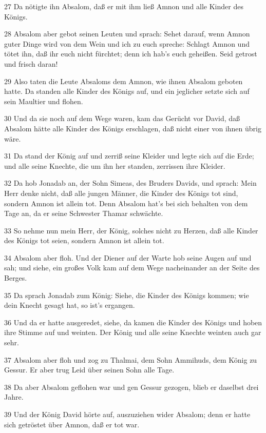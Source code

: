 \par 27 Da nötigte ihn Absalom, daß er mit ihm ließ Amnon und alle Kinder des Königs.
\par 28 Absalom aber gebot seinen Leuten und sprach: Sehet darauf, wenn Amnon guter Dinge wird von dem Wein und ich zu euch spreche: Schlagt Amnon und tötet ihn, daß ihr euch nicht fürchtet; denn ich hab's euch geheißen. Seid getrost und frisch daran!
\par 29 Also taten die Leute Absaloms dem Amnon, wie ihnen Absalom geboten hatte. Da standen alle Kinder des Königs auf, und ein jeglicher setzte sich auf sein Maultier und flohen.
\par 30 Und da sie noch auf dem Wege waren, kam das Gerücht vor David, daß Absalom hätte alle Kinder des Königs erschlagen, daß nicht einer von ihnen übrig wäre.
\par 31 Da stand der König auf und zerriß seine Kleider und legte sich auf die Erde; und alle seine Knechte, die um ihn her standen, zerrissen ihre Kleider.
\par 32 Da hob Jonadab an, der Sohn Simeas, des Bruders Davids, und sprach: Mein Herr denke nicht, daß alle jungen Männer, die Kinder des Königs tot sind, sondern Amnon ist allein tot. Denn Absalom hat's bei sich behalten von dem Tage an, da er seine Schwester Thamar schwächte.
\par 33 So nehme nun mein Herr, der König, solches nicht zu Herzen, daß alle Kinder des Königs tot seien, sondern Amnon ist allein tot.
\par 34 Absalom aber floh. Und der Diener auf der Warte hob seine Augen auf und sah; und siehe, ein großes Volk kam auf dem Wege nacheinander an der Seite des Berges.
\par 35 Da sprach Jonadab zum König: Siehe, die Kinder des Königs kommen; wie dein Knecht gesagt hat, so ist's ergangen.
\par 36 Und da er hatte ausgeredet, siehe, da kamen die Kinder des Königs und hoben ihre Stimme auf und weinten. Der König und alle seine Knechte weinten auch gar sehr.
\par 37 Absalom aber floh und zog zu Thalmai, dem Sohn Ammihuds, dem König zu Gessur. Er aber trug Leid über seinen Sohn alle Tage.
\par 38 Da aber Absalom geflohen war und gen Gessur gezogen, blieb er daselbst drei Jahre.
\par 39 Und der König David hörte auf, auszuziehen wider Absalom; denn er hatte sich getröstet über Amnon, daß er tot war.

